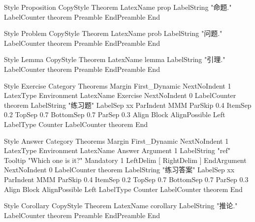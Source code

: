 Style Proposition
    CopyStyle              Theorem
    LatexName             prop
    LabelString           "命题\thetheorem."
    LabelCounter             theorem
    Preamble
    EndPreamble
    End
    
Style Problem
    CopyStyle              Theorem
    LatexName             prob
    LabelString           "问题."
    LabelCounter             theorem
    Preamble
    EndPreamble
    End

Style Lemma
    CopyStyle              Theorem
    LatexName             lemma
    LabelString           "引理\thetheorem."
    LabelCounter             theorem
    Preamble
    EndPreamble
    End

Style Exercise
    Category              Theorems
    Margin                First_Dynamic
	NextNoIndent          1    
	LatexType             Environment
    LatexName             Exercise
    NextNoIndent          0
    LabelCounter          theorem
    LabelString           "练习题\thetheorem"
    LabelSep              xx
	ParIndent             MMM
	ParSkip               0.4
	ItemSep               0.2
	TopSep                0.7
	BottomSep             0.7
	ParSep                0.3
	Align                 Block
	AlignPossible         Left
	LabelType             Counter
	LabelCounter          theorem
    End
    
Style Answer
    Category              Theorems
    Margin                First_Dynamic
	NextNoIndent          1    
	LatexType             Environment
    LatexName             Answer
    Argument 1
    	LabelString    "ref"
    	Tooltip        "Which one is it?"
    	Mandatory      1
    	LeftDelim      [
    	RightDelim    ]
    EndArgument
    NextNoIndent          0
    LabelCounter          theorem
    LabelString           "练习答案"
    LabelSep              xx
	ParIndent             MMM
	ParSkip               0.4
	ItemSep               0.2
	TopSep                0.7
	BottomSep             0.7
	ParSep                0.3
	Align                 Block
	AlignPossible         Left
	LabelType             Counter
	LabelCounter          theorem
    End


    
Style Corollary
    CopyStyle              Theorem
    LatexName             corollary
    LabelString           "推论\thetheorem."
    LabelCounter             theorem
    Preamble
    EndPreamble
    End

